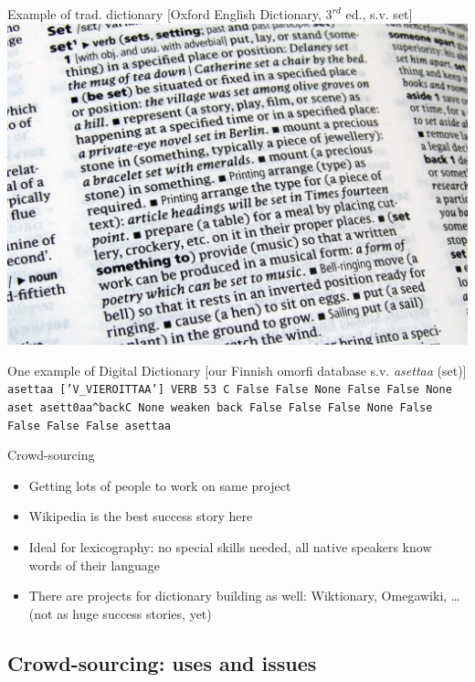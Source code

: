 \documentclass[t,12pt]{beamer}
\begin{document}
\begin{frame}[plain]{Example of trad. dictionary}
    [Oxford English Dictionary, $3^{rd}$ ed., s.v. set]
    \includegraphics[keepaspectratio=true,width=1\paperwidth]{oed}
\end{frame}

\begin{frame}{One example of Digital Dictionary}
    [our Finnish omorfi database s.v. \emph{asettaa} (set)]
\texttt{
asettaa	['V\_VIEROITTAA']	VERB	53	C	False	False	None	False	False	None	aset	aset{t0}aa{\textasciicircum back}{C}	None	weaken	back	False	False	False	None	False	False	False	False	asettaa
    }
\end{frame}

\begin{frame}{Crowd-sourcing}
    \begin{itemize}
        \item Getting lots of people to work on same project
        \item Wikipedia is the best success story here
        \item Ideal for lexicography: no special skills needed, all native
            speakers know words of their language
        \item There are projects for dictionary building as well:
            Wiktionary, Omegawiki, \ldots (not as huge success stories, yet)
    \end{itemize}
\end{frame}

\subsection{Crowd-sourcing: uses and issues}
\end{document}
